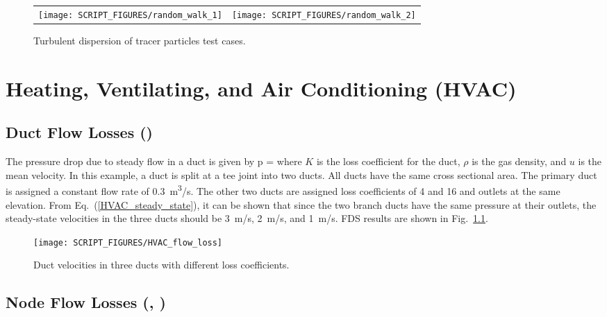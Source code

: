 \documentclass[11pt]{book}
\begin{document}
\begin{figure}[ht]
\begin{tabular*}{\textwidth}{lr}
\texttt{[image: SCRIPT\_FIGURES/random\_walk\_1]} &
\texttt{[image: SCRIPT\_FIGURES/random\_walk\_2]}
\end{tabular*}
\caption[Turbulent dispersion of tracer particles]{Turbulent dispersion of tracer particles  test cases.}
\label{random_walk_fig}
\end{figure}




\chapter{Heating, Ventilating, and Air Conditioning (HVAC)}

\section{Duct Flow Losses (\texorpdfstring{}{HVAC\_flow\_loss})}
\label{HVAC_flow_loss}

The pressure drop due to steady flow in a duct is given by
\be
\Delta p =   \label {HVAC_steady_state}
\ee
where $K$ is the loss coefficient for the duct, $\rho$ is the gas density, and $u$ is the mean velocity. In this example, a duct is split at a tee joint into two ducts. All ducts have the same cross sectional area.  The primary duct is assigned a constant flow rate of 0.3~\si{m^3/s}.  The other two ducts are assigned loss coefficients of 4 and 16 and outlets at the same elevation.  From Eq.~(\ref{HVAC_steady_state}), it can be shown that since the two branch ducts have the same pressure at their outlets, the steady-state velocities in the three ducts should be 3~m/s, 2~m/s, and 1~m/s.  FDS results are shown in Fig.~\ref{fig_HVAC_loss}.

\begin{figure}[ht]
\centering
\texttt{[image: SCRIPT\_FIGURES/HVAC\_flow\_loss]}
\caption[The  test case]{Duct velocities in three ducts with different loss coefficients.}
\label{fig_HVAC_loss}
\end{figure}


\section{Node Flow Losses (\texorpdfstring{}{HVAC\_tee\_loss\_1}, \texorpdfstring{}{HVAC\_tee\_loss\_2})}
\label{HVAC_tee_loss_1}
\label{HVAC_tee_loss_2}
\end{document}
